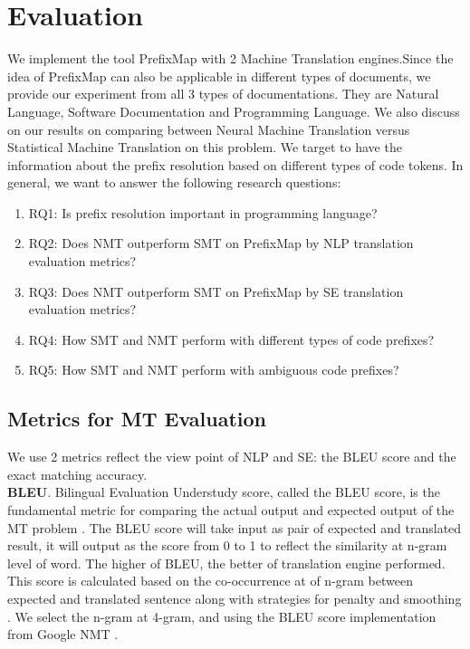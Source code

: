 \section{Evaluation}
We implement the tool PrefixMap with 2 Machine Translation engines.Since the idea of PrefixMap can also be applicable in different types of documents, we provide our experiment from all 3 types of documentations. They are Natural Language, Software Documentation and Programming Language. We also discuss on our results on comparing between Neural Machine Translation versus Statistical Machine Translation on this problem. We target to have the information about the prefix resolution based on different types of code tokens. In general, we want to answer the following research questions:

\begin{enumerate}
\item RQ1: Is prefix resolution important in programming language?
\item RQ2: Does NMT outperform SMT on PrefixMap by NLP translation evaluation metrics?
\item RQ3: Does NMT outperform SMT on PrefixMap by SE translation evaluation metrics?
\item RQ4: How SMT and NMT perform with different types of code prefixes?
\item RQ5: How SMT and NMT perform with ambiguous code prefixes?
\end{enumerate}

\subsection{Metrics for MT Evaluation}
We use 2 metrics reflect the view point of NLP and SE: the BLEU score and the exact matching accuracy. 
\\
\textbf{BLEU}. Bilingual Evaluation Understudy score, called the BLEU score, is the fundamental metric for comparing the actual output and expected output of the MT problem \cite{045}.  The BLEU score will take input as pair of expected and translated result, it will output as the score from 0 to 1 to reflect the similarity at n-gram level of word. The higher of BLEU, the better of translation engine performed. This score is calculated based on the co-occurrence at of n-gram between expected and translated sentence along with strategies for penalty and smoothing \cite{045}. We select the n-gram at 4-gram, and using the BLEU score implementation from Google NMT \cite{040}.

